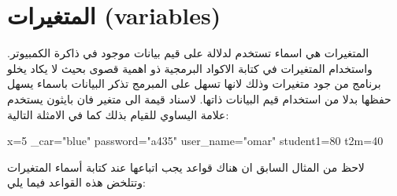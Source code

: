 \section{المتغيرات \textenglish{(variables)}}
المتغيرات هي اسماء تستخدم لدلالة على قيم بيانات موجود في ذاكرة الكمبيوتر. واستخدام المتغيرات في كتابة الاكواد البرمجية ذو اهمية قصوى بحيث لا يكاد يخلو برنامج من جود متغيرات وذلك لانها تسهل على المبرمج تذكر البيانات باسماء يسهل حفظها بدلا من استخدام قيم البيانات ذاتها.
لاسناد قيمة الى متغير فان بايثون يستخدم علامة اليساوي للقيام بذلك كما في الامثلة التالية:
\begin{english}
\begin{mybox}
\begin{pyconsole}
x=5
_car="blue"
password="a435"
user_name="omar"
student1=80
t2m=40
\end{pyconsole}
\end{mybox}
\end{english}
لاحظ من المثال السابق ان هناك قواعد يجب اتباعها عند كتابة أسماء المتغيرات وتتلخض هذه القواعد فيما يلي:

